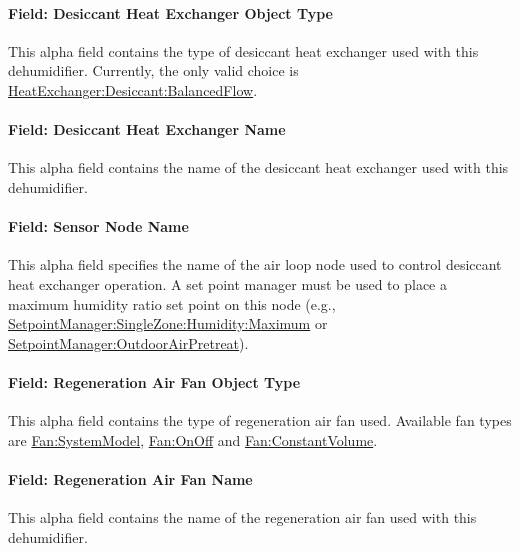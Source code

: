 \paragraph{Field: Desiccant Heat Exchanger Object Type}\label{field-desiccant-heat-exchanger-object-type}

This alpha field contains the type of desiccant heat exchanger used with this dehumidifier. Currently, the only valid choice is \hyperref[heatexchangerdesiccantbalancedflow]{HeatExchanger:Desiccant:BalancedFlow}.

\paragraph{Field: Desiccant Heat Exchanger Name}\label{field-desiccant-heat-exchanger-name}

This alpha field contains the name of the desiccant heat exchanger used with this dehumidifier.

\paragraph{Field: Sensor Node Name}\label{field-sensor-node-name-000}

This alpha field specifies the name of the air loop node used to control desiccant heat exchanger operation. A set point manager must be used to place a maximum humidity ratio set point on this node (e.g., \hyperref[setpointmanagersinglezonehumiditymaximum]{SetpointManager:SingleZone:Humidity:Maximum} or \hyperref[setpointmanageroutdoorairpretreat]{SetpointManager:OutdoorAirPretreat}).

\paragraph{Field: Regeneration Air Fan Object Type}\label{field-regeneration-air-fan-object-type}

This alpha field contains the type of regeneration air fan used. Available fan types are \hyperref[fansystemmodel]{Fan:SystemModel}, \hyperref[fanonoff]{Fan:OnOff} and \hyperref[fanconstantvolume]{Fan:ConstantVolume}.

\paragraph{Field: Regeneration Air Fan Name}\label{field-regeneration-air-fan-name}

This alpha field contains the name of the regeneration air fan used with this dehumidifier.

